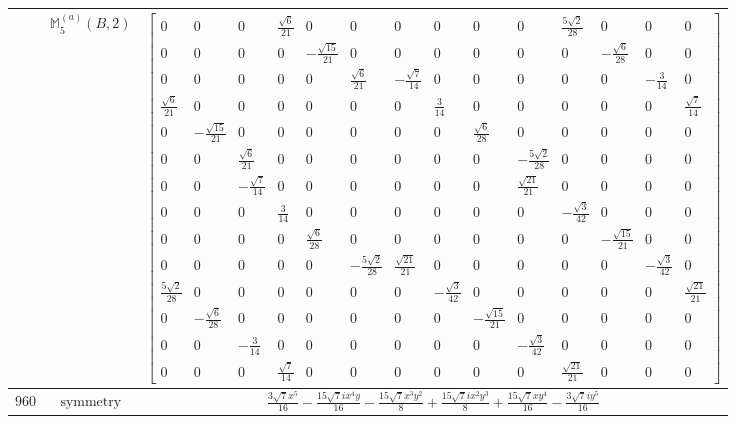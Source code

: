 \documentclass[fleqn,8pt,landscape]{jsarticle}
\begin{document}
\begin{longtable}{ccc}
$  $ & $ \mathbb{M}_{5}^{(a)}(B,2) $ & $ \begin{bmatrix} 0 & 0 & 0 & \frac{\sqrt{6}}{21} & 0 & 0 & 0 & 0 & 0 & 0 & \frac{5 \sqrt{2}}{28} & 0 & 0 & 0 \\ 0 & 0 & 0 & 0 & - \frac{\sqrt{15}}{21} & 0 & 0 & 0 & 0 & 0 & 0 & - \frac{\sqrt{6}}{28} & 0 & 0 \\ 0 & 0 & 0 & 0 & 0 & \frac{\sqrt{6}}{21} & - \frac{\sqrt{7}}{14} & 0 & 0 & 0 & 0 & 0 & - \frac{3}{14} & 0 \\ \frac{\sqrt{6}}{21} & 0 & 0 & 0 & 0 & 0 & 0 & \frac{3}{14} & 0 & 0 & 0 & 0 & 0 & \frac{\sqrt{7}}{14} \\ 0 & - \frac{\sqrt{15}}{21} & 0 & 0 & 0 & 0 & 0 & 0 & \frac{\sqrt{6}}{28} & 0 & 0 & 0 & 0 & 0 \\ 0 & 0 & \frac{\sqrt{6}}{21} & 0 & 0 & 0 & 0 & 0 & 0 & - \frac{5 \sqrt{2}}{28} & 0 & 0 & 0 & 0 \\ 0 & 0 & - \frac{\sqrt{7}}{14} & 0 & 0 & 0 & 0 & 0 & 0 & \frac{\sqrt{21}}{21} & 0 & 0 & 0 & 0 \\ 0 & 0 & 0 & \frac{3}{14} & 0 & 0 & 0 & 0 & 0 & 0 & - \frac{\sqrt{3}}{42} & 0 & 0 & 0 \\ 0 & 0 & 0 & 0 & \frac{\sqrt{6}}{28} & 0 & 0 & 0 & 0 & 0 & 0 & - \frac{\sqrt{15}}{21} & 0 & 0 \\ 0 & 0 & 0 & 0 & 0 & - \frac{5 \sqrt{2}}{28} & \frac{\sqrt{21}}{21} & 0 & 0 & 0 & 0 & 0 & - \frac{\sqrt{3}}{42} & 0 \\ \frac{5 \sqrt{2}}{28} & 0 & 0 & 0 & 0 & 0 & 0 & - \frac{\sqrt{3}}{42} & 0 & 0 & 0 & 0 & 0 & \frac{\sqrt{21}}{21} \\ 0 & - \frac{\sqrt{6}}{28} & 0 & 0 & 0 & 0 & 0 & 0 & - \frac{\sqrt{15}}{21} & 0 & 0 & 0 & 0 & 0 \\ 0 & 0 & - \frac{3}{14} & 0 & 0 & 0 & 0 & 0 & 0 & - \frac{\sqrt{3}}{42} & 0 & 0 & 0 & 0 \\ 0 & 0 & 0 & \frac{\sqrt{7}}{14} & 0 & 0 & 0 & 0 & 0 & 0 & \frac{\sqrt{21}}{21} & 0 & 0 & 0 \end{bmatrix} $ \\ \hline
$ 960 $ & $ \text{symmetry} $ & $ \frac{3 \sqrt{7} x^{5}}{16} - \frac{15 \sqrt{7} i x^{4} y}{16} - \frac{15 \sqrt{7} x^{3} y^{2}}{8} + \frac{15 \sqrt{7} i x^{2} y^{3}}{8} + \frac{15 \sqrt{7} x y^{4}}{16} - \frac{3 \sqrt{7} i y^{5}}{16} $ \\

\end{longtable}
\end{document}
